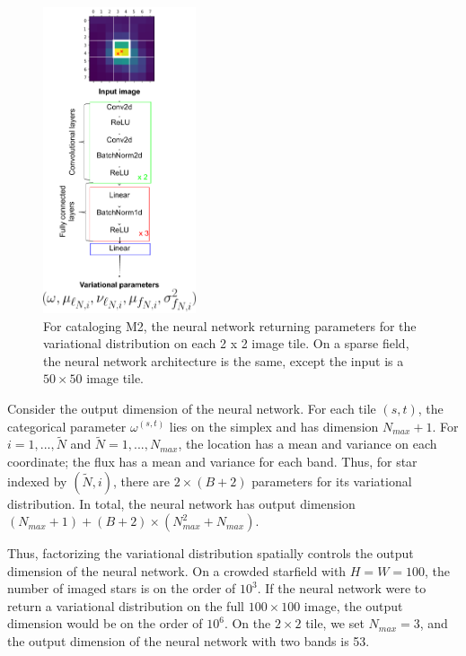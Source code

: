 \begin{figure}[!ht]
    \centering
    \includegraphics[width=0.4\textwidth]{figures/starnet_archetecture2.png}
    \vspace{-0.5cm}
    \caption{For cataloging M2, the neural network returning parameters for the variational distribution on each 2 x 2 image tile.
    On a sparse field, the neural network architecture is the same, 
    except the input is a $50 \times 50$ image tile. }
    \label{fig:starnet_arch}
\end{figure}

Consider the output dimension of the neural network. For each tile $(s,t)$, the categorical parameter $\omega^{(s,t)}$
lies on the simplex and has dimension $N_{max} + 1$. 
For $i = 1, ..., \tilde N$ and $\tilde N = 1, ..., N_{max}$, the location has a mean and variance on each coordinate; the flux has a mean and variance for each band. Thus, for star indexed by $(\tilde N, i)$, 
there are $2 \times (B + 2)$ parameters for its variational distribution. In total, the neural network has output dimension $(N_{max} + 1) + (B + 2) \times (N_{max}^2 + N_{max})$. 


Thus, factorizing the variational distribution spatially controls the output dimension of the neural network. On a crowded starfield with $H = W = 100$, the number of imaged stars is on the order of $10^3$. If the neural network were to return a variational distribution on the full $100\times 100$ image, the output dimension would be on the order of $10^6$. 
On the $2\times 2$ tile, we set $N_{max} = 3$, and the output dimension of the neural network with two bands is 53. 

